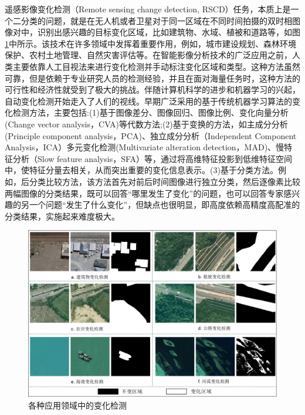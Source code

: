 \documentclass[lang=chs, degree=master, blindreview=false, adobe=false]{yanputhesis}
\begin{document}
遥感影像变化检测（Remote sensing change detection, RSCD）任务，本质上是一个二分类的问题，就是在无人机或者卫星对于同一区域在不同时间拍摄的双时相图像对中，识别出感兴趣的目标变化区域，比如建筑物、水域、植被和道路等，如图\ref{fig:background}中所示。该技术在许多领域中发挥着重要作用，例如，城市建设规划\cite{urban2010ISPRS}\cite{Zhang24urban}\cite{urban2024}、森林环境保护\cite{hao2016forestCD}、农村土地管理\cite{xing2023Progressive}\cite{xing2024Improving}\cite{ruralLand}、自然灾害评估\cite{disaster2018landslide}\cite{disaster2018earthquake}等。在智能影像分析技术的广泛应用之前，人类主要依靠人工目视法来进行变化检测并手动标注变化区域和类型。这种方法虽然可靠，但是依赖于专业研究人员的检测经验，并且在面对海量任务时，这种方法的可行性和经济性就受到了极大的挑战。伴随计算机科学的进步和机器学习的兴起，自动变化检测开始走入了人们的视线。早期广泛采用的基于传统机器学习算法的变化检测方法，主要包括:(1)基于图像差分\cite{mondini2011semi}、图像回归\cite{ludeke1990logistic_regression}、图像比例\cite{mondini2011semi}、变化向量分析\cite{du2020CVA}(Change vector analysis，CVA)等代数方法;(2)基于变换的方法，如主成分分析\cite{celik2009pca}(Principle component analysis，PCA)、独立成分分析\cite{marchesi2009ica}（Independent Component Analysis，ICA）多元变化检测\cite{nielsen1998mad}(Multivariate alteration detection，MAD)、慢特征分析\cite{wu2013slow}（Slow feature analysis，SFA）等，通过将高维特征投影到低维特征空间中，使特征分量去相关，从而突出重要的变化信息表示。(3)基于分类方法。例如，后分类比较方法，该方法首先对前后时间图像进行独立分类，然后逐像素比较两幅图像的分类结果，既可以回答“哪里发生了变化”的问题，也可以回答专家感兴趣的另一个问题“发生了什么变化”，但缺点也很明显，即高度依赖高精度高配准的分类结果，实施起来难度极大。
\begin{figure}[htb]
	\centering
	\includegraphics[scale=0.55]{images/fig1.png}
	\caption{
		各种应用领域中的变化检测
	}
	\label{fig:background}
\end{figure}
\end{document}
